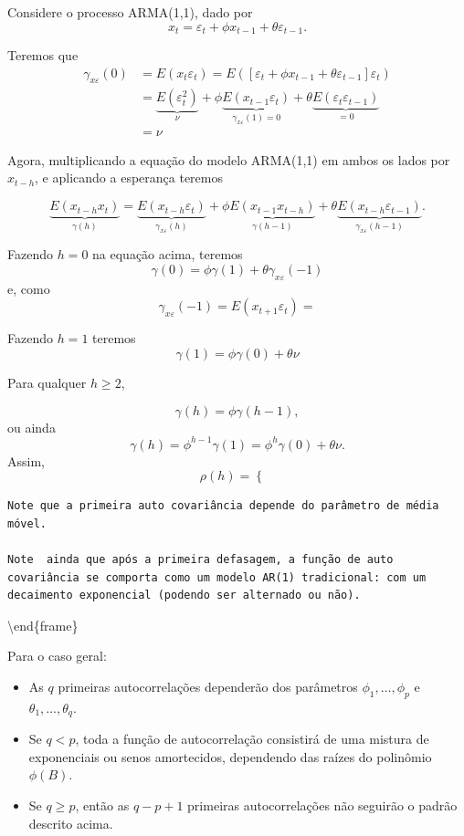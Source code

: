 \documentclass[
  letterpaper,
  DIV=11,
  numbers=noendperiod]{scrartcl}
\theoremstyle{definition}
\theoremstyle{definition}
\theoremstyle{plain}
\theoremstyle{plain}
\theoremstyle{remark}
\begin{document}
Considere o processo ARMA(1,1), dado por
\[x_t = \varepsilon_{t} + \phi x_{t-1} + \theta\varepsilon_{t-1}.\]

Teremos que \begin{align*}
\gamma_{x\varepsilon}(0)&=E(x_t\varepsilon_t) = E( \left[\varepsilon_t + \phi x_{t-1} + \theta\varepsilon_{t-1} \right]\varepsilon_t)\\
&=\underbrace{E(\varepsilon_t^2)}_{\nu}+ \phi\underbrace{ E(x_{t-1}\varepsilon_t)}_{\gamma_{x\varepsilon}(1)=0} +\theta \underbrace{E(\varepsilon_{t}\varepsilon_{t-1})}_{=0} \\
&=\nu
\end{align*}

Agora, multiplicando a equação do modelo ARMA(1,1) em ambos os lados por
\(x_{t-h}\), e aplicando a esperança teremos

\begin{equation}
    \underbrace{E(x_{t-h}x_t)}_{\gamma(h)} = \underbrace{E(x_{t-h}\varepsilon_{t})}_{\gamma_{x\varepsilon}(h)} + \phi \underbrace{E(x_{t-1}x_{t-h})}_{\gamma(h-1)} + \theta \underbrace{E(x_{t-h}\varepsilon_{t-1})}_{\gamma_{x\varepsilon}(h-1)}.
    \end{equation}

Fazendo \(h=0\) na equação acima, teremos
\[\gamma(0)=\phi\gamma(1) + \theta\gamma_{x\varepsilon}(-1)\] e, como
\[\gamma_{x\varepsilon}(-1)=E(x_{t+1}\varepsilon_t)=\]

Fazendo \(h=1\) teremos \[\gamma(1)=\phi\gamma(0)+\theta\nu\]

Para qualquer \(h\geq 2\),

\[\gamma(h)=\phi\gamma(h-1),\] ou ainda
\[\gamma(h)=\phi^{h-1}\gamma(1)=\phi^h\gamma(0)+\theta\nu.\] Assim,
\[\rho(h)=\left\{\begin{array}{ll}\end{array}\right.\]

\begin{verbatim}
Note que a primeira auto covariância depende do parâmetro de média móvel.

Note  ainda que após a primeira defasagem, a função de auto covariância se comporta como um modelo AR(1) tradicional: com um decaimento exponencial (podendo ser alternado ou não).
\end{verbatim}

\textbackslash end\{frame\}

\begin{frame}
    Para o caso geral:
    \begin{itemize}
        \item As $q$ primeiras autocorrelações dependerão dos parâmetros $\phi_1,\ldots,\phi_p$ e $\theta_1,\ldots,\theta_q$.
        \item Se $q<p$, toda a função de autocorrelação consistirá de uma mistura de exponenciais ou senos amortecidos, dependendo das raízes do polinômio $\phi(B)$.
        \item Se $q\geq p$, então as $q-p+1$ primeiras autocorrelações não seguirão o padrão descrito acima.
    \end{itemize}
\end{frame}
\end{document}
